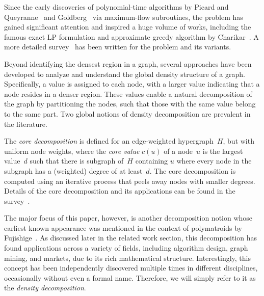 

Since the early discoveries of polynomial-time algorithms
by Picard and Queyranne~\cite{DBLP:journals/networks/PicardQ82}
and Goldberg~\cite{goldberg1984finding} via maximum-flow subroutines, the problem
has gained significant attention and inspired a huge volume of works,
including the famous exact LP formulation and approximate greedy algorithm by 
Charikar~\cite{10.1007/3-540-44436-X_10}.  A more detailed survey~\cite{DBLP:journals/csur/LancianoMFB24} has been written for the problem and its variants.

\noindent {}
Beyond identifying the densest region in a graph, several approaches have been developed to analyze and understand the global density structure of a graph. Specifically, a value is assigned to each node, with a larger value indicating that a node resides in a denser region. These values enable a natural decomposition of the graph by partitioning the nodes, such that those with the same value belong to the same part. Two global notions of density decomposition are prevalent in the literature.


The \emph{core decomposition} is defined
for an edge-weighted hypergraph~$H$, but with uniform node weights,
where the \emph{core value} $c(u)$ of a node~$u$ is the largest value~$d$
such that there is subgraph of~$H$ containing $u$ where every node
in the subgraph has a (weighted) degree of at least~$d$.
The core decomposition is computed using an iterative process that peels away nodes with smaller degrees.
Details of the core decomposition
and its applications can be found in the survey~\cite{DBLP:journals/vldb/MalliarosGPV20}.

The major focus of this paper, however, 
is another decomposition notion whose earliest known
appearance was mentioned in the context
of polymatroids by Fujishige~\cite{fujishige1980lexicographically}.
As discussed later in the related work section, this decomposition has found applications across a variety of fields, including algorithm design, graph mining, and markets, due to its rich mathematical structure. Interestingly, this concept has been independently discovered multiple times in different disciplines, occasionally without even a formal name. Therefore, we will simply refer to it as the \emph{density decomposition}.

